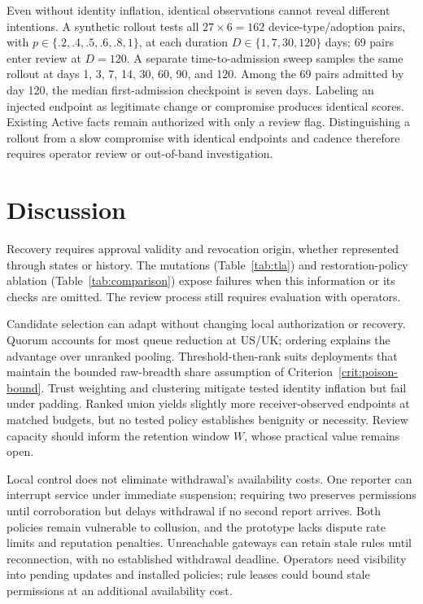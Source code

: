 \documentclass[journal]{IEEEtran}
\theoremstyle{definition}
\begin{document}
Even without identity inflation, identical observations cannot reveal different intentions. A synthetic rollout tests all $27\times6=162$ device-type/adoption pairs, with $p\in\{.2,.4,.5,.6,.8,1\}$, at each duration $D\in\{1,7,30,120\}$ days; 69 pairs enter review at $D=120$. A separate time-to-admission sweep samples the same rollout at days 1, 3, 7, 14, 30, 60, 90, and 120. Among the 69 pairs admitted by day 120, the median first-admission checkpoint is seven days. Labeling an injected endpoint as legitimate change or compromise produces identical scores. Existing Active facts remain authorized with only a review flag. Distinguishing a rollout from a slow compromise with identical endpoints and cadence therefore requires operator review or out-of-band investigation.



\section{Discussion}
\label{sec:discussion}

Recovery requires approval validity and revocation origin, whether represented through states or history. The mutations (Table~\ref{tab:tla}) and restoration-policy ablation (Table~\ref{tab:comparison}) expose failures when this information or its checks are omitted. The review process still requires evaluation with operators.

Candidate selection can adapt without changing local authorization or recovery. Quorum accounts for most queue reduction at US/UK; ordering explains the advantage over unranked pooling. Threshold-then-rank suits deployments that maintain the bounded raw-breadth share assumption of Criterion~\ref{crit:poison-bound}. Trust weighting and clustering mitigate tested identity inflation but fail under padding. Ranked union yields slightly more receiver-observed endpoints at matched budgets, but no tested policy establishes benignity or necessity. Review capacity should inform the retention window $W$, whose practical value remains open.

Local control does not eliminate withdrawal's availability costs. One reporter can interrupt service under immediate suspension; requiring two preserves permissions until corroboration but delays withdrawal if no second report arrives. Both policies remain vulnerable to collusion, and the prototype lacks dispute rate limits and reputation penalties. Unreachable gateways can retain stale rules until reconnection, with no established withdrawal deadline. Operators need visibility into pending updates and installed policies; rule leases could bound stale permissions at an additional availability cost.
\end{document}
